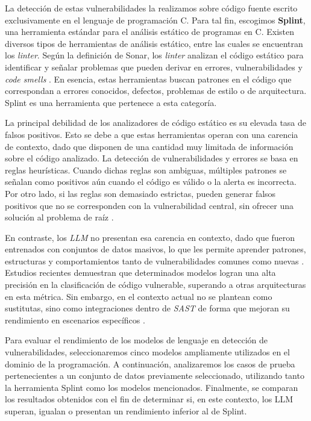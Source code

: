 \documentclass[12pt, a4paper, twoside]{article}
\begin{document}
La detección de estas vulnerabilidades la realizamos sobre código fuente escrito exclusivamente en el lenguaje de programación C. Para tal fin, escogimos \textbf{Splint}, una herramienta estándar para el análisis estático de programas en C. Existen diversos tipos de herramientas de análisis estático, entre las cuales se encuentran los \textit{linter}. Según la definición de Sonar, los \textit{linter} analizan el código estático para identificar y señalar problemas que pueden derivar en errores, vulnerabilidades y \textit{code smells} \cite{sonarsource-2024}. En esencia, estas herramientas buscan patrones en el código que correspondan a errores conocidos, defectos, problemas de estilo o de arquitectura. Splint es una herramienta que pertenece a esta categoría.

La principal debilidad de los analizadores de código estático es su elevada tasa de falsos positivos. Esto se debe a que estas herramientas operan con una carencia de contexto, dado que disponen de una cantidad muy limitada de información sobre el código analizado. La detección de vulnerabilidades y errores se basa en reglas heurísticas. Cuando dichas reglas son ambiguas, múltiples patrones se señalan como positivos aún cuando el código es válido o la alerta es incorrecta. Por otro lado, si las reglas son demasiado estrictas, pueden generar falsos positivos que no se corresponden con la vulnerabilidad central, sin ofrecer una solución al problema de raíz \cite{holden2024code}.

En contraste, los \textit{LLM} no presentan esa carencia en contexto, dado que fueron entrenados con conjuntos de datos masivos, lo que les permite aprender patrones, estructuras y comportamientos tanto de vulnerabilidades comunes como nuevas \cite{gladkikh-et-al-2025}. Estudios recientes demuestran que determinados modelos logran una alta precisión en la clasificación de código vulnerable, superando a otras arquitecturas en esta métrica. Sin embargo, en el contexto actual no se plantean como sustitutas, sino como integraciones dentro de \textit{SAST} de forma que mejoran su rendimiento en escenarios específicos \cite{SANTASCIAVATTA2026}.

Para evaluar el rendimiento de los modelos de lenguaje en detección de vulnerabilidades, seleccionaremos cinco modelos ampliamente utilizados en el dominio de la programación. A continuación, analizaremos los casos de prueba pertenecientes a un conjunto de datos previamente seleccionado, utilizando tanto la herramienta Splint como los modelos mencionados. Finalmente, se comparan los resultados obtenidos con el fin de determinar si, en este contexto, los LLM superan, igualan o presentan un rendimiento inferior al de Splint.
\end{document}
